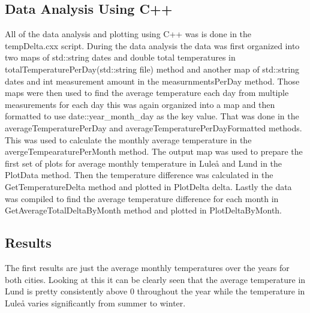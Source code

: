 \documentclass[aps,prl,groupedaddress,twocolumn]{revtex4-1}
\begin{document}
\subsection{Data Analysis Using C++}
All of the data analysis and plotting using C++ was is done in the tempDelta.cxx script.
During the data analysis the data was first organized into two maps of std::string dates and double total temperatures in totalTemperaturePerDay(std::string file) method and another map of std::string dates and int measurement amount in the measurnmentsPerDay method. Those maps were then used to find the average temperature each day from multiple measurements for each day this was again organized into a map and then formatted to use date::year\_month\_day as the key value. That was done in the averageTemperaturePerDay and averageTemperaturePerDayFormatted methods. This was used to calculate the monthly average temperature in the avergeTempearaturePerMonth method. The output map was used to prepare the first set of plots for average monthly temperature in Luleå and Lund in the PlotData method. Then the temperature difference was calculated in the GetTemperatureDelta method and plotted in PlotDelta delta. Lastly the data was compiled to find the average temperature difference for each month in GetAverageTotalDeltaByMonth method and plotted in PlotDeltaByMonth.
\vspace{-0.6cm}

\subsection{Results}
The first results are just the average monthly temperatures over the years for both cities. Looking at this it can be clearly seen that the average temperature in Lund is pretty consistently above 0 throughout the year while the temperature in Luleå varies significantly from summer to winter.
\vspace{-0.2cm}
\end{document}
